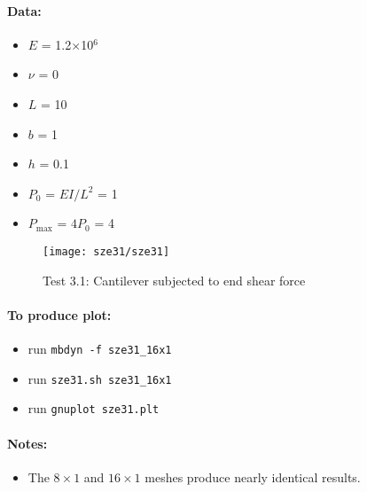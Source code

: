 \documentclass{article}
\newcommand{\mesh}[2]{#1$\times$#2}
\begin{document}
\paragraph{Data:}
\begin{itemize}
\item $E$ = 1.2$\times$10$^6$
\item $\nu$ = 0
\item $L$ = 10
\item $b$ = 1
\item $h$ = 0.1
\item $P_0$ = $EI/L^2$ = 1
\item $P_\text{max}$ = $4P_0$ = 4
\end{itemize}

\begin{figure}[h]
\centering
{}
\psfrag{16x1}{\footnotesize \mesh{16}{1}}
\texttt{[image: sze31/sze31]}
\caption{Test 3.1: Cantilever subjected to end shear force}
\label{fig:sze31}
\end{figure}

\paragraph{To produce plot:}
\begin{itemize}
\item run \verb!mbdyn -f sze31_16x1!
\item run \verb!sze31.sh sze31_16x1!
\item run \verb!gnuplot sze31.plt!
\end{itemize}

\paragraph{Notes:}
\begin{itemize}
\item The $8\times1$ and $16\times1$ meshes produce nearly identical results.
\end{itemize}
\end{document}
